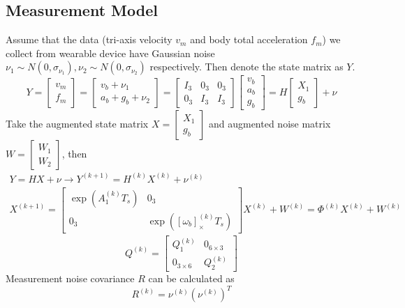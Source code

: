 \documentclass[12pt]{article}
\begin{document}
    \subsection{Measurement Model}
    Assume that the data (tri-axis velocity $v_m$ and body total acceleration $f_m$) we collect from wearable device have Gaussian noise $\nu_1 \sim N(0, \sigma_{\nu_1}), \nu_2 \sim N(0, \sigma_{\nu_2})$ respectively. Then denote the state matrix as $Y$.
    \begin{equation}
        Y = \begin{bmatrix}
            v_m \\ f_m
        \end{bmatrix} = \begin{bmatrix}
            v_b + \nu_1 \\
            a_b + g_b + \nu_2
        \end{bmatrix} = \begin{bmatrix}
            I_3 & 0_3 & 0_3 \\
            0_3 & I_3 & I_3
        \end{bmatrix} \begin{bmatrix}
            v_b \\ a_b \\ g_b
        \end{bmatrix}= H\begin{bmatrix}
            X_1 \\ g_b 
        \end{bmatrix} + \nu
    \end{equation} 
    Take the augmented state matrix $X = \begin{bmatrix}
        X_1 \\ g_b
    \end{bmatrix}$ and augmented noise matrix $W = \begin{bmatrix}
        W_1 \\ W_2
    \end{bmatrix}$, then
    \begin{gather}
        Y = HX + \nu \rightarrow Y^{(k+1)} = H^{(k)}X^{(k)} + \nu^{(k)} \\
        X^{(k+1)} = \begin{bmatrix}
            \exp \left( A_1^{(k)} T_s \right) & 0_3 \\
            0_3 & \exp \left([\omega_b]_{\times}^{(k)} T_s \right)
        \end{bmatrix} X^{(k)}
        + W^{(k)} = \Phi^{(k)} X^{(k)} + W^{(k)}
    \end{gather} 
    \begin{equation}
    Q^{(k)} = \begin{bmatrix}
        Q_1^{(k)} & 0_{6 \times 3} \\
        0_{3 \times 6} & Q_2^{(k)}
    \end{bmatrix}
    \end{equation}
    Measurement noise covariance $R$ can be calculated as
    \begin{equation}
        R^{(k)} = \nu^{(k)} \left( \nu^{(k)}\right)^T
    \end{equation}
\end{document}
